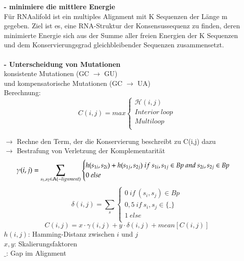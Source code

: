 \textbf{- minimiere die mittlere Energie} \\
Für RNAalifold ist ein multiples Alignment mit K Sequenzen der Länge m gegeben. Ziel ist es, eine RNA-Struktur der Konsensussequenz zu finden, deren minimierte Energie sich aus der Summe aller freien Energien der K Sequenzen und dem Konservierungsgrad gleichbleibender Sequenzen zusammensetzt.\\
\\
\textbf{- Unterscheidung von Mutationen} \\
konsistente Mutationen (GC $\rightarrow$ GU) \\
und kompensatorische Mutationen (GC $\rightarrow$ UA) \\ 

Berechnung:
\begin{equation}
C(i,j)= max
\begin{cases} 
\mathcal{H}(i,j)\\ 
Interior~loop\\ 
Multiloop\\
\end{cases}
\end{equation}

$\rightarrow$  Rechne den Term, der die Konservierung beschreibt zu C(i,j) dazu \\
$\rightarrow$ Bestrafung von Verletzung der Komplementarität\\
	\begin{equation}
	\gamma(i,j)= \sum_{s_1,s_2 \in \mathbb{A}(-lignment)\\} 
	\begin{cases} 
	h(s_{1i},s_{2i}) + h(s_{1j},s_{2j}) \ if\ s_{1i},s_{1j} \in Bp \ and \ s_{2i},s_{2j} \in Bp \\
	0 \ else\\
	\end{cases} 
	\end{equation}
	\begin{equation}	 
		\delta(i,j)= \sum_{s} 
		\begin{cases} 
			0 \ if\ (s_{i},s_{j}) \in Bp \\
			0,5 \ if\ s_{i}, s_{j} \in \{\_\} \\ 
			1 \ else\\
		\end{cases}
	\end{equation}
	\begin{equation} 
		C(i,j)= x \cdot \gamma (i,j) + y \cdot \delta (i,j)+ mean[C(i,j)]  
	\end{equation}
$h(i,j)$: Hamming-Distanz zwischen $i$ und $j$ \\
$x,y$: Skalierungsfaktoren\\
$\_$: Gap im Alignment\\

